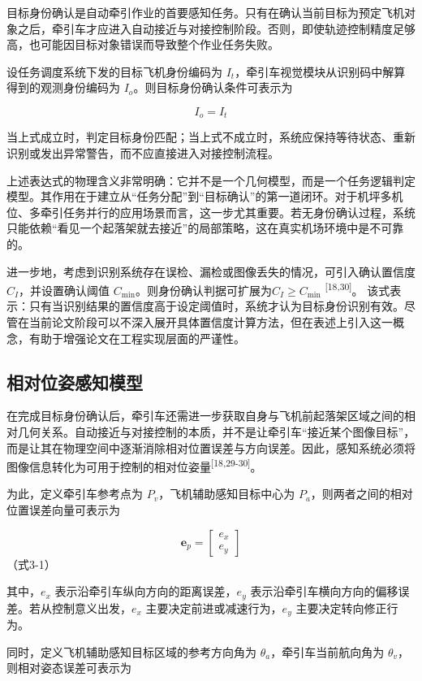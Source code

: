 \documentclass[UTF8,a4paper,12pt]{ctexart}
\begin{document}
目标身份确认是自动牵引作业的首要感知任务。只有在确认当前目标为预定飞机对象之后，牵引车才应进入自动接近与对接控制阶段。否则，即使轨迹控制精度足够高，也可能因目标对象错误而导致整个作业任务失败。

设任务调度系统下发的目标飞机身份编码为 \(I_{t}\)，牵引车视觉模块从识别码中解算得到的观测身份编码为 \(I_{o}\)。则目标身份确认条件可表示为

\[I_{o} = I_{t}
\]

当上式成立时，判定目标身份匹配；当上式不成立时，系统应保持等待状态、重新识别或发出异常警告，而不应直接进入对接控制流程。

上述表达式的物理含义非常明确：它并不是一个几何模型，而是一个任务逻辑判定模型。其作用在于建立从``任务分配''到``目标确认''的第一道闭环。对于机坪多机位、多牵引任务并行的应用场景而言，这一步尤其重要。若无身份确认过程，系统只能依赖``看见一个起落架就去接近''的局部策略，这在真实机场环境中是不可靠的。

进一步地，考虑到识别系统存在误检、漏检或图像丢失的情况，可引入确认置信度 \(C_{I}\)，并设置确认阈值 \(C_{\min}\)。则身份确认判据可扩展为\(C_{I} \geq C_{\min}\) \textsuperscript{[18,30]}。\(
\) 该式表示：只有当识别结果的置信度高于设定阈值时，系统才认为目标身份识别有效。尽管在当前论文阶段可以不深入展开具体置信度计算方法，但在表述上引入这一概念，有助于增强论文在工程实现层面的严谨性。

\subsection{相对位姿感知模型}\label{_Toc228997190}

在完成目标身份确认后，牵引车还需进一步获取自身与飞机前起落架区域之间的相对几何关系。自动接近与对接控制的本质，并不是让牵引车``接近某个图像目标''，而是让其在物理空间中逐渐消除相对位置误差与方向误差。因此，感知系统必须将图像信息转化为可用于控制的相对位姿量\textsuperscript{[18,29-30]}。

为此，定义牵引车参考点为 \(P_{v}\)，飞机辅助感知目标中心为 \(P_{a}\)，则两者之间的相对位置误差向量可表示为

\[
\mathbf{e}_{p} = \begin{bmatrix}
e_x \\
e_y
\end{bmatrix}
\]
（式3-1）

其中，\(e_{x}\) 表示沿牵引车纵向方向的距离误差，\(e_{y}\) 表示沿牵引车横向方向的偏移误差。若从控制意义出发，\(e_{x}\) 主要决定前进或减速行为，\(e_{y}\) 主要决定转向修正行为。

同时，定义飞机辅助感知目标区域的参考方向角为 \(\theta_{a}\)，牵引车当前航向角为 \(\theta_{v}\)，则相对姿态误差可表示为
\end{document}
